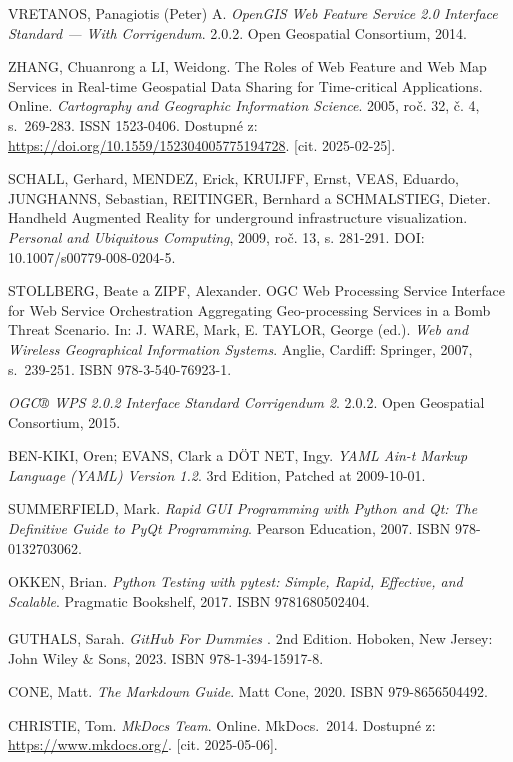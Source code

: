 \documentclass[a4paper,oneside,12pt]{book}
\begin{document}
\begin{thebibliography}{1}
VRETANOS, Panagiotis (Peter) A. \textit{OpenGIS Web Feature Service 2.0 Interface Standard --- With Corrigendum}. 2.0.2. Open Geospatial Consortium, 2014.

ZHANG, Chuanrong a LI, Weidong. The Roles of Web Feature and Web Map Services in Real-time Geospatial Data Sharing for Time-critical Applications. Online. \textit{Cartography and Geographic Information Science}. 2005, roč. 32, č. 4, s.~269-283. ISSN 1523-0406. Dostupné z: \url{https://doi.org/10.1559/152304005775194728}. [cit. 2025-02-25].

SCHALL, Gerhard, MENDEZ, Erick, KRUIJFF, Ernst, VEAS, Eduardo, JUNGHANNS, Sebastian, REITINGER, Bernhard a SCHMALSTIEG, Dieter.  
Handheld Augmented Reality for underground infrastructure visualization.  
\textit{Personal and Ubiquitous Computing}, 2009, roč. 13, s. 281-291.  
DOI: 10.1007/s00779-008-0204-5.  

STOLLBERG, Beate a ZIPF, Alexander. OGC Web Processing Service Interface for Web Service Orchestration Aggregating Geo-processing Services in a Bomb Threat Scenario. In: J. WARE, Mark, E. TAYLOR, George (ed.). \textit{Web and Wireless Geographical Information Systems}. Anglie, Cardiff: Springer, 2007, s.~239-251. ISBN 978-3-540-76923-1.

\textit{OGC® WPS 2.0.2 Interface Standard Corrigendum 2}. 2.0.2. Open Geospatial Consortium, 2015.

BEN-KIKI, Oren; EVANS, Clark a DÖT NET, Ingy. \textit{YAML Ain-t Markup Language (YAML) Version 1.2}. 3rd Edition, Patched at 2009-10-01.

SUMMERFIELD, Mark. \textit{Rapid GUI Programming with Python and Qt: The Definitive Guide to PyQt Programming}. Pearson Education, 2007. ISBN 978-0132703062.

OKKEN, Brian. \textit{Python Testing with pytest: Simple, Rapid, Effective, and Scalable}. Pragmatic Bookshelf, 2017. ISBN 9781680502404.

GUTHALS, Sarah. \textit{GitHub\texorpdfstring{\textsuperscript{\textregistered}}{ (R)} For Dummies \texorpdfstring{\textsuperscript{\textregistered}}{(R)}}. 2nd Edition. Hoboken, New Jersey: John Wiley \& Sons, 2023. ISBN 978-1-394-15917-8.

CONE, Matt. \textit{The Markdown Guide}. Matt Cone, 2020. ISBN 979-8656504492.

CHRISTIE, Tom. \textit{MkDocs Team}. Online. MkDocs.~2014. Dostupné z: \url{https://www.mkdocs.org/}. [cit. 2025-05-06].


\end{thebibliography}
\end{document}

